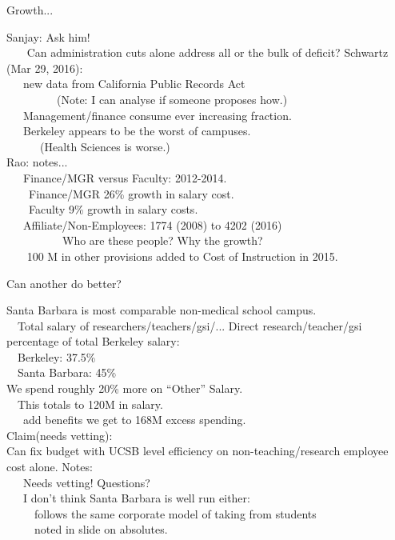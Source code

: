 \documentclass[hyperref={colorlinks}]{beamer}
\newcommand{\skippause}{\vskip5pt
\pause}
\begin{document}
\begin{frame}{Growth...}

Sanjay: Ask  him! \\
~~~{\color{blue} Can administration cuts alone address all or the bulk of deficit?}
\skippause
Schwartz (Mar 29, 2016): \\
~~~new data from California Public Records Act \\
~~~~~~~~~(Note: I can analyse if someone proposes how.) \\ 
~~~Management/finance consume ever increasing fraction.  \\
~~~Berkeley appears to be the worst of campuses.\\
~~~~~~(Health Sciences is worse.) \\
\skippause
Rao: notes... \\ 
~~~Finance/MGR versus Faculty: 2012-2014. \\
~~~~Finance/MGR 26\% growth in salary cost. \\
~~~~Faculty  9\% growth in salary costs. \\
~~~Affiliate/Non-Employees: {\color{red} 1774 (2008) to 4202 (2016)} \\
~~~~~~~~~~Who are these people? Why the growth? \\
~~~{\color{red} 100 M} in other provisions added to Cost of Instruction in 2015. \\
\end{frame}


\begin{frame}{Can another do better?}

Santa Barbara is most comparable non-medical school campus.\\
\skippause
~~Total salary of researchers/teachers/gsi/...
\skippause
Direct research/teacher/gsi percentage of total Berkeley salary: \\
~~Berkeley: 37.5\%  \\
~~Santa Barbara: 45\% \\
\skippause
We spend roughly {\color{red} 20\%} more on ``Other'' Salary. \\
~~This totals to 120M in salary. \\
~~~add benefits we get to {\color{blue} 168M} excess spending.\\
\skippause
{\color{red} Claim(needs vetting): \\
 Can fix budget with UCSB level efficiency on non-teaching/research employee cost {\color{blue} alone.}}
\skippause
Notes: \\
~~~Needs vetting!  Questions? \\
~~~I don't think Santa Barbara is well run either: \\
~~~~~follows the same corporate model of taking from students \\
~~~~~noted in slide on absolutes. 
\skippause


\end{frame}
\end{document}
